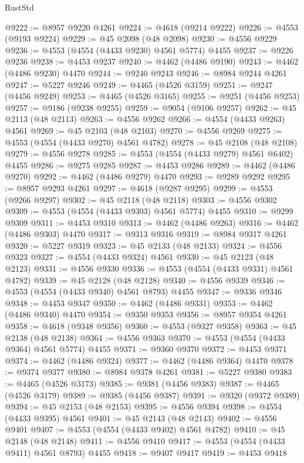 \begin{lexlean}{RustStd}
\begin{coremodule}
@9222 := @8957 @9220 @4261
@9224 := @4618 (@9214 @9222)
@9226 := @4553 (@9193 @9224)
@9229 := @45 @2098 (@48 @2098)
@9230 := @4556 @9229
@9236 := @4553 (@4554 (@4433 @9230) @4561 @5774) @4455
@9237 := @9226 @9236
@9238 := @4453 @9237
@9240 := @4462 (@4486 @9190)
@9243 := @4462 (@4486 @9230) @4470
@9244 := @9240 @9243
@9246 := @8984 @9244 @4261
@9247 := @5227 @9246
@9249 := @4465 (@4526 @3159)
@9251 := @9247 (@4456 @9249)
@9253 := @4465 (@4526 @3165)
@9255 := @9251 (@4456 @9253)
@9257 := @9186 (@9238 @9255)
@9259 := @9054 (@9106 @9257)
@9262 := @45 @2113 (@48 @2113)
@9263 := @4556 @9262
@9266 := @4554 (@4433 @9263) @4561
@9269 := @45 @2103 (@48 @2103)
@9270 := @4556 @9269
@9275 := @4553 (@4554 (@4433 @9270) @4561 @4782)
@9278 := @45 @2108 (@48 @2108)
@9279 := @4556 @9278
@9285 := @4553 (@4554 (@4433 @9279) @4561 @6402) @4455
@9286 := @9275 @9285
@9287 := @4453 @9286
@9289 := @4462 (@4486 @9270)
@9292 := @4462 (@4486 @9279) @4470
@9293 := @9289 @9292
@9295 := @8957 @9293 @4261
@9297 := @4618 (@9287 @9295)
@9299 := @4553 (@9266 @9297)
@9302 := @45 @2118 (@48 @2118)
@9303 := @4556 @9302
@9309 := @4553 (@4554 (@4433 @9303) @4561 @5774) @4455
@9310 := @9299 @9309
@9311 := @4453 @9310
@9313 := @4462 (@4486 @9263)
@9316 := @4462 (@4486 @9303) @4470
@9317 := @9313 @9316
@9319 := @8984 @9317 @4261
@9320 := @5227 @9319
@9323 := @45 @2133 (@48 @2133)
@9324 := @4556 @9323
@9327 := @4554 (@4433 @9324) @4561
@9330 := @45 @2123 (@48 @2123)
@9331 := @4556 @9330
@9336 := @4553 (@4554 (@4433 @9331) @4561 @4782)
@9339 := @45 @2128 (@48 @2128)
@9340 := @4556 @9339
@9346 := @4553 (@4554 (@4433 @9340) @4561 @8793) @4455
@9347 := @9336 @9346
@9348 := @4453 @9347
@9350 := @4462 (@4486 @9331)
@9353 := @4462 (@4486 @9340) @4470
@9354 := @9350 @9353
@9356 := @8957 @9354 @4261
@9358 := @4618 (@9348 @9356)
@9360 := @4553 (@9327 @9358)
@9363 := @45 @2138 (@48 @2138)
@9364 := @4556 @9363
@9370 := @4553 (@4554 (@4433 @9364) @4561 @5774) @4455
@9371 := @9360 @9370
@9372 := @4453 @9371
@9374 := @4462 (@4486 @9324)
@9377 := @4462 (@4486 @9364) @4470
@9378 := @9374 @9377
@9380 := @8984 @9378 @4261
@9381 := @5227 @9380
@9383 := @4465 (@4526 @3173)
@9385 := @9381 (@4456 @9383)
@9387 := @4465 (@4526 @3179)
@9389 := @9385 (@4456 @9387)
@9391 := @9320 (@9372 @9389)
@9394 := @45 @2153 (@48 @2153)
@9395 := @4556 @9394
@9398 := @4554 (@4433 @9395) @4561
@9401 := @45 @2143 (@48 @2143)
@9402 := @4556 @9401
@9407 := @4553 (@4554 (@4433 @9402) @4561 @4782)
@9410 := @45 @2148 (@48 @2148)
@9411 := @4556 @9410
@9417 := @4553 (@4554 (@4433 @9411) @4561 @8793) @4455
@9418 := @9407 @9417
@9419 := @4453 @9418

\end{coremodule}
\end{lexlean}
